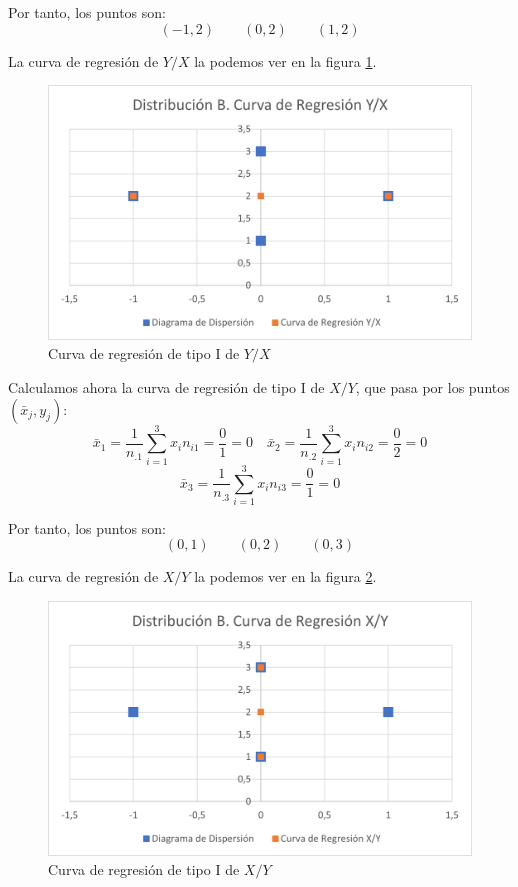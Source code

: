 \begin{ejercicio}
\begin{enumerate}
        Por tanto, los puntos son:
        \begin{equation*}
            (-1, 2) \qquad (0, 2) \qquad (1, 2)
        \end{equation*}
        
        La curva de regresión de $Y/X$ la podemos ver en la figura \ref{fig:Ej5.B.1}.
        \begin{figure}[H]
            \centering
            \includegraphics[width=0.7\linewidth]{Imagenes/Ej5.B.1.png}
            \caption{Curva de regresión de tipo I de $Y/X$}
            \label{fig:Ej5.B.1}
        \end{figure}

        Calculamos ahora la curva de regresión de tipo I de $X/Y$, que pasa por los puntos $(\bar{x}_j, y_j)$:
        \begin{equation*}
            \bar{x}_1 = \frac{1}{n_{.1}}\sum_{i=1}^3 x_in_{i1} = \frac{0}{1} = 0
            \quad
            \bar{x}_2 = \frac{1}{n_{.2}}\sum_{i=1}^3 x_in_{i2} = \frac{0}{2} = 0
        \end{equation*}
        \begin{equation*}
            \bar{x}_3 = \frac{1}{n_{.3}}\sum_{i=1}^3 x_in_{i3} = \frac{0}{1} = 0
        \end{equation*}

        Por tanto, los puntos son:
        \begin{equation*}
            (0,1) \qquad (0, 2) \qquad (0,3)
        \end{equation*}

        La curva de regresión de $X/Y$ la podemos ver en la figura \ref{fig:Ej5.B.2}.
        \begin{figure}[H]
            \centering
            \includegraphics[width=0.7\linewidth]{Imagenes/Ej5.B.2.png}
            \caption{Curva de regresión de tipo I de $X/Y$}
            \label{fig:Ej5.B.2}
        \end{figure}
    \end{enumerate}
    
\end{ejercicio}

